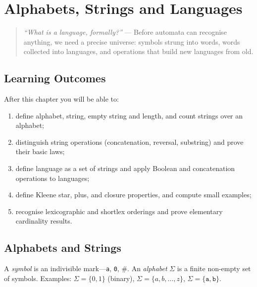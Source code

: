 \chapter{Alphabets, Strings and Languages}
\label{ch:alphabets}

\begin{quote}
\emph{``What is a language, formally?''} --- Before automata can recognise anything, we need a precise universe: symbols strung into words, words collected into languages, and operations that build new languages from old.
\end{quote}

\noindent{}
\vspace{0.4em}

\section*{Learning Outcomes}
After this chapter you will be able to:
\begin{enumerate}[label=(L\arabic*)]
    \item define alphabet, string, empty string and length, and count strings over an alphabet;
    \item distinguish string operations (concatenation, reversal, substring) and prove their basic laws;
    \item define language as a set of strings and apply Boolean and concatenation operations to languages;
    \item define Kleene star, plus, and closure properties, and compute small examples;
    \item recognise lexicographic and shortlex orderings and prove elementary cardinality results.
\end{enumerate}

\section{Alphabets and Strings}
\label{sec:alphabets}
A \emph{symbol} is an indivisible mark---\texttt{a}, \texttt{0}, $\#$. An \emph{alphabet} $\Sigma$ is a finite non-empty set of symbols. Examples: $\Sigma=\{0,1\}$ (binary), $\Sigma=\{a,b,\dots,z\}$, $\Sigma=\{\texttt{a},\texttt{b}\}$.

